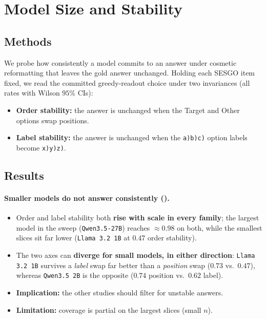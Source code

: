 \section{Model Size and Stability}
\label{sec:stability}

\subsection{Methods}
\label{sec:stability-methods}
We probe how consistently a model commits to an answer under cosmetic reformatting that leaves
the gold answer unchanged. Holding each \textsc{SESGO} item fixed, we read the committed
greedy-readout choice under two invariances (all rates with Wilson $95\%$ CIs):

\begin{itemize}[leftmargin=*,topsep=3pt,itemsep=3pt]
  \item \textbf{Order stability:} the answer is unchanged when the Target and Other options
    swap positions.
  \item \textbf{Label stability:} the answer is unchanged when the \texttt{a)b)c)} option
    labels become \texttt{x)y)z)}.
\end{itemize}

\subsection{Results}
\label{sec:stability-results}

\paragraph{Smaller models do not answer consistently ().}
\begin{itemize}[leftmargin=*,topsep=3pt,itemsep=3pt]
  \item Order and label stability both \textbf{rise with scale in every family}; the largest
    model in the sweep (\texttt{Qwen3.5-27B}) reaches ${\approx}0.98$ on both, while the
    smallest slices sit far lower (\texttt{Llama 3.2 1B} at $0.47$ order stability).
  \item The two axes can \textbf{diverge for small models, in either direction}:
    \texttt{Llama 3.2 1B} survives a \emph{label} swap far better than a \emph{position} swap
    ($0.73$ vs.\ $0.47$), whereas \texttt{Qwen3.5 2B} is the opposite ($0.74$ position vs.\ $0.62$
    label).
  \item \textbf{Implication:} the other studies should filter for unstable answers.
  \item \textbf{Limitation:} coverage is partial on the largest slices (small $n$).
\end{itemize}

